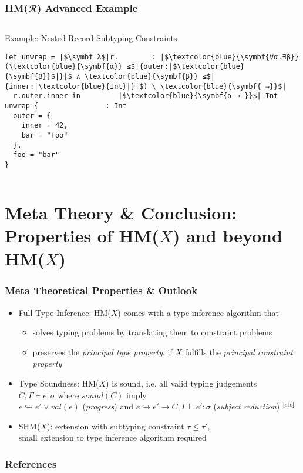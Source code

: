 \documentclass[aspectratio=169]{beamer}
\begin{document}
\begin{frame}[fragile]
  \frametitle{HM($𝓡$) Advanced Example}
  \begin{columns}
    \begin{column}{0.85\textwidth}
      \begin{center}
        \begin{block}{Example: Nested Record Subtyping Constraints}
          \begin{verbatim}
let unwrap = |$\symbf λ$|r.        : |$\textcolor{blue}{\symbf{∀α.∃β}}(\textcolor{blue}{\symbf{α}} ≤$|{outer:|$\textcolor{blue}{\symbf{β}}$|}|$ ∧ \textcolor{blue}{\symbf{β}} ≤$|{inner:|\textcolor{blue}{Int}|}|$) \ \textcolor{blue}{\symbf{ ⇒}}$|
  r.outer.inner in         |$\textcolor{blue}{\symbf{α → }}$| Int
unwrap {                : Int
  outer = {
    inner = 42, 
    bar = "foo"
  }, 
  foo = "bar"
} 
          \end{verbatim}
        \end{block}
      \end{center}
    \end{column}
  \end{columns}
\end{frame}

\section{Meta Theory \& Conclusion: Properties of HM($X$) and beyond HM($X$)}

\begingroup
\large
\begin{frame}[fragile]
  \frametitle{Meta Theoretical Properties \& Outlook}
  \begin{itemize}
    \item Full Type Inference: HM($X$) comes with a type inference algorithm
          that
          \begin{itemize}
            \item solves typing problems by translating them to constraint
                  problems
            \item preserves the \emph{principal type property}, if $X$ fulfills
                  the \emph{principal constraint property}
          \end{itemize}
    \item Type Soundness: HM($X$) is sound, i.e. all valid typing judgements
          \\ \quad $C, Γ ⊢ e : σ$ where $sound(C)$ imply \\
          \quad $e ↪ e′ ∨ val(e)$ (\emph{progress}) and
          $e ↪ e′ → C, Γ ⊢ e′ : σ$ (\emph{subject reduction})
          $^{\text{\cite{sts}}}$
    \item SHM($X$): extension with subtyping constraint $τ ≤ τ′$, \\
          \quad small extension to type inference algorithm required
  \end{itemize}
\end{frame}
\endgroup

\begin{frame}[fragile]
  \frametitle{References}
  \nocite{atapl}
  \printbibliography
\end{frame}
\end{document}
